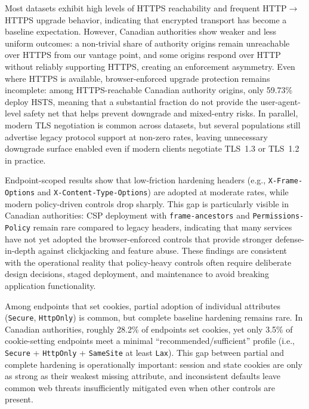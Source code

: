 \documentclass[a4paper,fleqn]{cas-sc}
\begin{document}
    Most datasets exhibit high levels of HTTPS reachability and frequent HTTP$\rightarrow$HTTPS upgrade behavior, indicating that encrypted transport has become a baseline expectation. 
    However, Canadian authorities show weaker and less uniform outcomes: a non-trivial share of authority origins remain unreachable over HTTPS from our vantage point, and some origins respond over HTTP without reliably supporting HTTPS, creating an enforcement asymmetry. 
    Even where HTTPS is available, browser-enforced upgrade protection remains incomplete: among HTTPS-reachable Canadian authority origins, only 59.73\% deploy HSTS, meaning that a substantial fraction do not provide the user-agent-level safety net that helps prevent downgrade and mixed-entry risks. 
    In parallel, modern TLS negotiation is common across datasets, but several populations still advertise legacy protocol support at non-zero rates, leaving unnecessary downgrade surface enabled even if modern clients negotiate TLS~1.3 or TLS~1.2 in practice.

    Endpoint-scoped results show that low-friction hardening headers (e.g., \texttt{X-Frame-Options} and \texttt{X-Content-Type-Options}) are adopted at moderate rates, while modern policy-driven controls drop sharply. 
    This gap is particularly visible in Canadian authorities: CSP deployment with \texttt{frame-ancestors} and \texttt{Permissions-Policy} remain rare compared to legacy headers, indicating that many services have not yet adopted the browser-enforced controls that provide stronger defense-in-depth against clickjacking and feature abuse. These findings are consistent with the operational reality that policy-heavy controls often require deliberate design decisions, staged deployment, and maintenance to avoid breaking application functionality.

    Among endpoints that set cookies, partial adoption of individual attributes (\texttt{Secure}, \texttt{HttpOnly}) is common, but complete baseline hardening remains rare. In Canadian authorities, roughly 28.2\% of endpoints set cookies, yet only 3.5\% of cookie-setting endpoints meet a minimal ``recommended/sufficient'' profile (i.e., \texttt{Secure} + \texttt{HttpOnly} + \texttt{SameSite} at least \texttt{Lax}). This gap between partial and complete hardening is operationally important: session and state cookies are only as strong as their weakest missing attribute, and inconsistent defaults leave common web threats insufficiently mitigated even when other controls are present.
\end{document}
